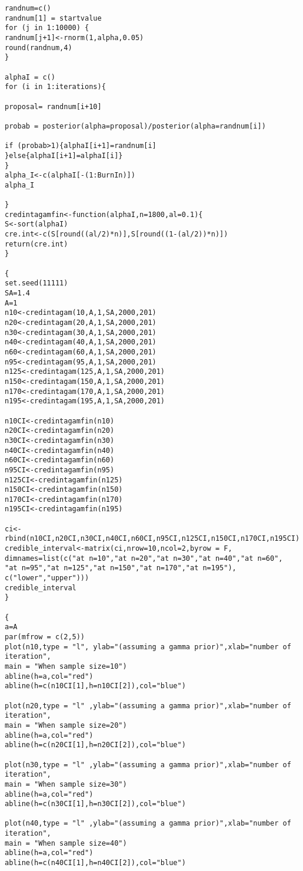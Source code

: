 \documentclass[a4paper,12pt]{report}
\begin{document}
{\begin{verbatim}
randnum=c()
randnum[1] = startvalue    
for (j in 1:10000) {
randnum[j+1]<-rnorm(1,alpha,0.05)
round(randnum,4)
}

alphaI = c()
for (i in 1:iterations){

proposal= randnum[i+10]

probab = posterior(alpha=proposal)/posterior(alpha=randnum[i])

if (probab>1){alphaI[i+1]=randnum[i]
}else{alphaI[i+1]=alphaI[i]}
}
alpha_I<-c(alphaI[-(1:BurnIn)])
alpha_I

}
credintagamfin<-function(alphaI,n=1800,al=0.1){
S<-sort(alphaI)
cre.int<-c(S[round((al/2)*n)],S[round((1-(al/2))*n)])
return(cre.int)
}

{
set.seed(11111)
SA=1.4
A=1
n10<-credintagam(10,A,1,SA,2000,201)
n20<-credintagam(20,A,1,SA,2000,201)
n30<-credintagam(30,A,1,SA,2000,201)
n40<-credintagam(40,A,1,SA,2000,201)
n60<-credintagam(60,A,1,SA,2000,201)
n95<-credintagam(95,A,1,SA,2000,201)
n125<-credintagam(125,A,1,SA,2000,201)
n150<-credintagam(150,A,1,SA,2000,201)
n170<-credintagam(170,A,1,SA,2000,201)
n195<-credintagam(195,A,1,SA,2000,201)

n10CI<-credintagamfin(n10)
n20CI<-credintagamfin(n20)
n30CI<-credintagamfin(n30)
n40CI<-credintagamfin(n40)
n60CI<-credintagamfin(n60)
n95CI<-credintagamfin(n95)
n125CI<-credintagamfin(n125)
n150CI<-credintagamfin(n150)
n170CI<-credintagamfin(n170)
n195CI<-credintagamfin(n195)

ci<-rbind(n10CI,n20CI,n30CI,n40CI,n60CI,n95CI,n125CI,n150CI,n170CI,n195CI)
credible_interval<-matrix(ci,nrow=10,ncol=2,byrow = F,
dimnames=list(c("at n=10","at n=20","at n=30","at n=40","at n=60",
"at n=95","at n=125","at n=150","at n=170","at n=195"),
c("lower","upper")))
credible_interval
}

{
a=A
par(mfrow = c(2,5))
plot(n10,type = "l", ylab="(assuming a gamma prior)",xlab="number of iteration",
main = "When sample size=10")
abline(h=a,col="red")
abline(h=c(n10CI[1],h=n10CI[2]),col="blue")

plot(n20,type = "l" ,ylab="(assuming a gamma prior)",xlab="number of iteration",
main = "When sample size=20")
abline(h=a,col="red")
abline(h=c(n20CI[1],h=n20CI[2]),col="blue")

plot(n30,type = "l" ,ylab="(assuming a gamma prior)",xlab="number of iteration",
main = "When sample size=30")
abline(h=a,col="red")
abline(h=c(n30CI[1],h=n30CI[2]),col="blue")

plot(n40,type = "l" ,ylab="(assuming a gamma prior)",xlab="number of iteration",
main = "When sample size=40")
abline(h=a,col="red")
abline(h=c(n40CI[1],h=n40CI[2]),col="blue")


\end{verbatim}}
\end{document}

